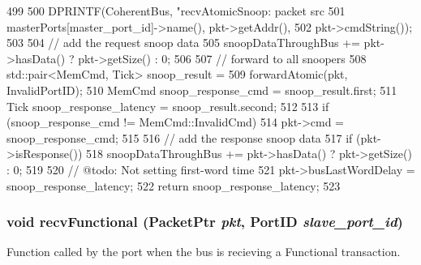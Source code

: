\begin{DoxyCode}
499 {
500     DPRINTF(CoherentBus, "recvAtomicSnoop: packet src %
501             masterPorts[master_port_id]->name(), pkt->getAddr(),
502             pkt->cmdString());
503 
504     // add the request snoop data
505     snoopDataThroughBus += pkt->hasData() ? pkt->getSize() : 0;
506 
507     // forward to all snoopers
508     std::pair<MemCmd, Tick> snoop_result =
509         forwardAtomic(pkt, InvalidPortID);
510     MemCmd snoop_response_cmd = snoop_result.first;
511     Tick snoop_response_latency = snoop_result.second;
512 
513     if (snoop_response_cmd != MemCmd::InvalidCmd)
514         pkt->cmd = snoop_response_cmd;
515 
516     // add the response snoop data
517     if (pkt->isResponse())
518         snoopDataThroughBus += pkt->hasData() ? pkt->getSize() : 0;
519 
520     // @todo: Not setting first-word time
521     pkt->busLastWordDelay = snoop_response_latency;
522     return snoop_response_latency;
523 }
\end{DoxyCode}
\hypertarget{classCoherentBus_a5cdfa7d369ba37394403d3c2bd5cf6d1}{
\subsubsection[{recvFunctional}]{\setlength{\rightskip}{0pt plus 5cm}void recvFunctional ({\bf PacketPtr} {\em pkt}, \/  {\bf PortID} {\em slave\_\-port\_\-id})}}
\label{classCoherentBus_a5cdfa7d369ba37394403d3c2bd5cf6d1}
Function called by the port when the bus is recieving a Functional transaction. 


